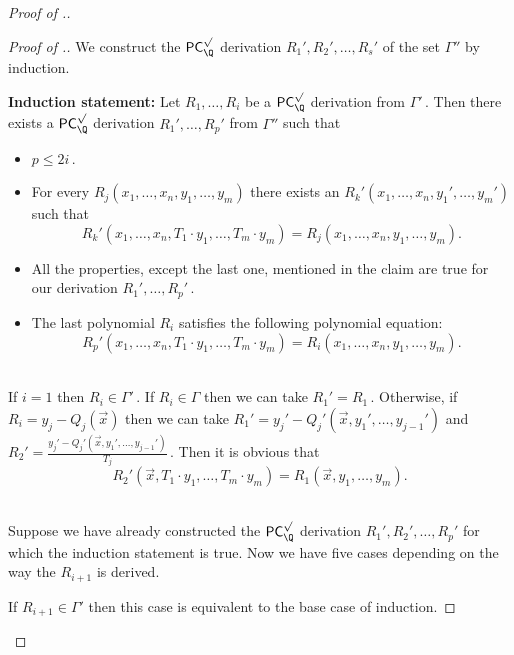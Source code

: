 \documentclass{toc}
\begin{document}
\begin{proof}[Proof of .]
\begin{claim}
\end{claim}

\begin{proof}[Proof of .]
%
We construct the $\mathsf{PC}_{\Q}^{\surd}$ derivation %
$R_1', R_2', \ldots, R_{s}'$ %
 of the set $\Gamma''$ by induction. \smallskip

\noindent\textbf{Induction statement:} 
Let %
$R_1, \ldots, R_i$ %
 be a $\mathsf{PC}_{\Q}^{\surd}$ derivation from %
$\Gamma'\,.$ %
 Then there exists a $\mathsf{PC}_{\Q}^{\surd}$ derivation %
$R_1', \ldots, R_p'$ %
 from $\Gamma''$ such that
\begin{itemize}
    \item %
$p \le 2 i\,.$ %
    \item For every $R_j(x_1, \ldots, x_n, y_1, \ldots, y_m)$ there exists an $R_k'(x_1, \ldots, x_n, y_1', \ldots, y_m')$ such that %
    $$
    R_k'(x_1, \ldots, x_n, T_1 \cdot y_1, \ldots, T_m \cdot y_m) = R_j(x_1, \ldots, x_n, y_1, \ldots, y_m).
    $$
    \item All the properties, except the last one, mentioned in the claim are true for our derivation %
$R_1', \ldots, R_p'\,.$ %
    \item 
    The last polynomial $R_i$ satisfies the following polynomial equation: %
    $$
    R_p'(x_1, \ldots, x_n, T_1 \cdot y_1, \ldots, T_m \cdot y_m) = R_i(x_1, \ldots, x_n, y_1, \ldots, y_m).
    $$
\end{itemize}

\mbox{}\\  If $i = 1$ then %
$R_i \in \Gamma'\,.$ %
 If $R_i \in \Gamma$ then we can take %
$R_1' = R_1\,.$ %
 Otherwise, if $R_i = y_j - Q_j(\vec x)$ then we can take $R_1' = y_j' - Q_j'(\vec x, y_1', \ldots, y_{j - 1}')$ and %
$R_2' = \frac{y_j' - Q_j'(\vec x, y_1', \ldots, y_{j - 1}')}{T_j}\,.$ %
%
Then it is obvious that %
$$
R_2'(\vec x, T_1 \cdot y_1, \ldots, T_m \cdot y_m) = R_1(\vec x, y_1, \ldots, y_m).
$$

\mbox{}\\  Suppose we have already constructed the $\mathsf{PC}_{\Q}^{\surd}$ derivation %
$R_1', R_2', \ldots, R_{p}'$ %
 for which the induction statement is true. Now we have five cases depending on the way the $R_{i + 1}$ is derived.

 If $R_{i + 1} \in \Gamma'$ then this case is equivalent to the base case of induction. 


\end{proof}
\end{proof}
\end{document}
